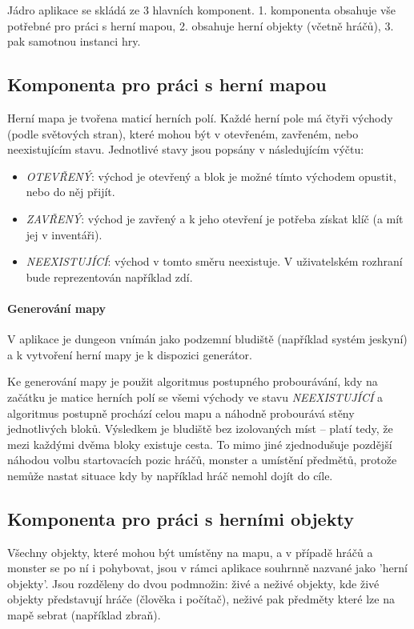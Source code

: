 \documentclass[11pt,a4paper]{scrartcl}
\begin{document}
	Jádro aplikace se skládá ze 3 hlavních komponent. 1. komponenta obsahuje vše potřebné pro práci s herní mapou, 2. obsahuje herní objekty (včetně hráčů), 3. pak samotnou instanci hry.
	
	\subsection{Komponenta pro práci s herní mapou}
	Herní mapa je tvořena maticí herních polí. Každé herní pole má čtyři východy (podle světových stran), které mohou být v otevřeném, zavřeném, nebo neexistujícím stavu. Jednotlivé stavy jsou popsány v následujícím výčtu:
	
	\begin{itemize}
		\item \textit{OTEVŘENÝ}: východ je otevřený a blok je možné tímto východem opustit, nebo do něj přijít.
		
		\item \textit{ZAVŘENÝ}: východ je zavřený a k jeho otevření je potřeba získat klíč (a mít jej v inventáři).
		
		\item \textit{NEEXISTUJÍCÍ}: východ v tomto směru neexistuje. V uživatelském rozhraní bude reprezentován například zdí.
	\end{itemize}
	
	\paragraph{Generování mapy}
	V aplikace je dungeon vnímán jako podzemní bludiště (například systém jeskyní) a k vytvoření herní mapy je k dispozici generátor. 
	
	Ke generování mapy je použit algoritmus postupného probourávání, kdy na začátku je matice herních polí se všemi východy ve stavu \textit{NEEXISTUJÍCÍ} a algoritmus postupně prochází celou mapu a náhodně probourává stěny jednotlivých bloků. Výsledkem je bludiště bez izolovaných míst -- platí tedy, že mezi každými dvěma bloky existuje cesta. To mimo jiné zjednodušuje pozdější náhodou volbu startovacích pozic hráčů, monster a umístění předmětů, protože nemůže nastat situace kdy by například hráč nemohl dojít do cíle.
	
	\subsection{Komponenta pro práci s herními objekty}
	Všechny objekty, které mohou být umístěny na mapu, a v případě hráčů a monster se po ní i pohybovat, jsou v rámci aplikace souhrnně nazvané jako 'herní objekty'. Jsou rozděleny do dvou podmnožin: živé a neživé objekty, kde živé objekty představují hráče (člověka i počítač), neživé pak předměty které lze na mapě sebrat (například zbraň).
	
\end{document}
